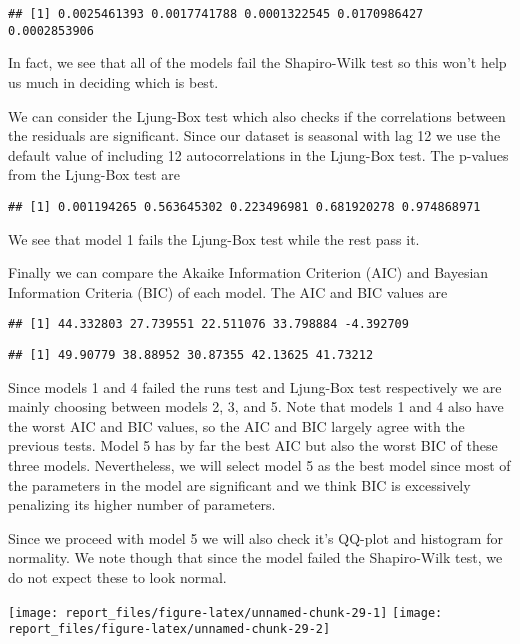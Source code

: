 \documentclass[
]{article}
\begin{document}
\begin{verbatim}
## [1] 0.0025461393 0.0017741788 0.0001322545 0.0170986427 0.0002853906
\end{verbatim}

In fact, we see that all of the models fail the Shapiro-Wilk test so
this won't help us much in deciding which is best.

We can consider the Ljung-Box test which also checks if the correlations
between the residuals are significant. Since our dataset is seasonal
with lag 12 we use the default value of including 12 autocorrelations in
the Ljung-Box test. The p-values from the Ljung-Box test are

\begin{verbatim}
## [1] 0.001194265 0.563645302 0.223496981 0.681920278 0.974868971
\end{verbatim}

We see that model 1 fails the Ljung-Box test while the rest pass it.

Finally we can compare the Akaike Information Criterion (AIC) and
Bayesian Information Criteria (BIC) of each model. The AIC and BIC
values are

\begin{verbatim}
## [1] 44.332803 27.739551 22.511076 33.798884 -4.392709
\end{verbatim}

\begin{verbatim}
## [1] 49.90779 38.88952 30.87355 42.13625 41.73212
\end{verbatim}

Since models 1 and 4 failed the runs test and Ljung-Box test
respectively we are mainly choosing between models 2, 3, and 5. Note
that models 1 and 4 also have the worst AIC and BIC values, so the AIC
and BIC largely agree with the previous tests. Model 5 has by far the
best AIC but also the worst BIC of these three models. Nevertheless, we
will select model 5 as the best model since most of the parameters in
the model are significant and we think BIC is excessively penalizing its
higher number of parameters.

Since we proceed with model 5 we will also check it's QQ-plot and
histogram for normality. We note though that since the model failed the
Shapiro-Wilk test, we do not expect these to look normal.

\begin{center}\texttt{[image: report\_files/figure-latex/unnamed-chunk-29-1]} \texttt{[image: report\_files/figure-latex/unnamed-chunk-29-2]} \end{center}
\end{document}
